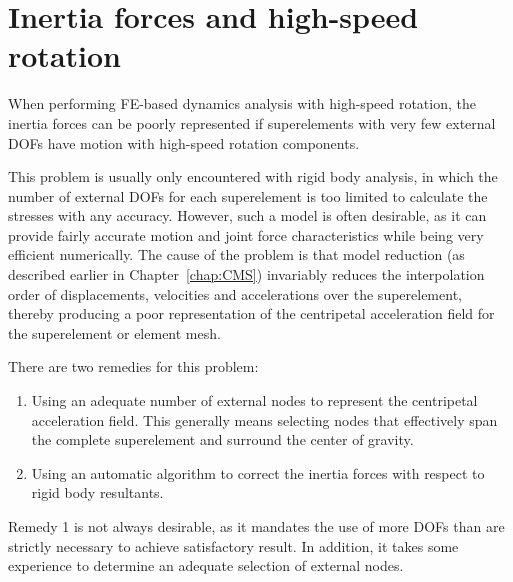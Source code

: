 %
%

%
%

\def\CGtiny{{\mbox{\tiny CG}}}
\def\CRtiny{{\mbox{\tiny CR}}}

\section{Inertia forces and high-speed rotation}
\label{s:Inertia forces and high-speed rotation}

When performing FE-based dynamics analysis with high-speed rotation, the inertia
forces can be poorly represented if superelements with very few external DOFs
have motion with high-speed rotation components.

This problem is usually only encountered with rigid body analysis, in which the
number of external DOFs for each superelement is too limited to calculate the
stresses with any accuracy.
However, such a model is often desirable, as it can provide fairly accurate
motion and joint force characteristics while being very efficient numerically.
The cause of the problem is that model reduction (as described earlier in
Chapter~\ref{chap:CMS}) invariably reduces the interpolation order of
displacements, velocities and accelerations over the superelement,
thereby producing a poor representation of the centripetal acceleration field
for the superelement or element mesh.

There are two remedies for this problem:
%
\begin{enumerate}
\item Using an adequate number of external nodes to represent the centripetal
acceleration field.
This generally means selecting nodes that effectively span the complete
superelement and surround the center of gravity.
\item Using an automatic algorithm to correct the inertia forces with respect to
rigid body resultants.
\end{enumerate}

Remedy 1 is not always desirable, as it mandates the use of more DOFs than are
strictly necessary to achieve satisfactory result.
In addition, it takes some experience to determine an adequate selection of
external nodes.

